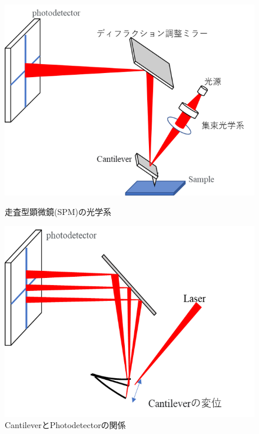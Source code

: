 \documentclass[dvipdfmx,12pt,a4paper]{jreport}
\begin{document}
	\begin{figure}[h]
		\centering
		\begin{minipage}{0.45\hsize}
			\centering
			\includegraphics[width=\linewidth]{SPM.png}
			\caption{走査型顕微鏡(SPM)の光学系}
			\label{SPM}
		\end{minipage}
		\begin{minipage}{0.45\hsize}
			\centering
			\includegraphics[width=\linewidth]{SPM2.png}
			\caption{CantileverとPhotodetectorの関係}
			\label{cantilever_photo_detector}
		\end{minipage}
	\end{figure}
\end{document}
